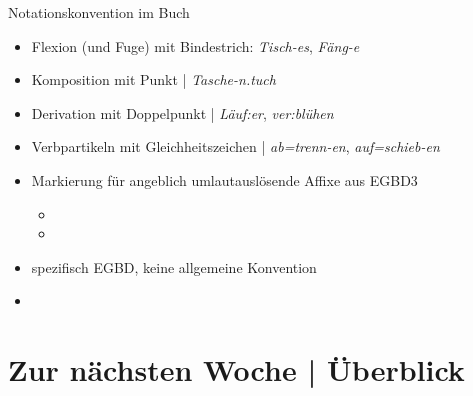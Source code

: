 \begin{frame}
  {Notationskonvention im Buch}
  \pause
  \begin{itemize}[<+->]
    \item \alert{Flexion (und Fuge)} mit Bindestrich: \textit{Tisch-es}, \textit{Fäng-e}
    \item \alert{Komposition} mit Punkt | \textit{Tasche-n.tuch}
    \item \alert{Derivation} mit Doppelpunkt | \textit{Läuf:er}, \textit{ver:blühen}
    \item \alert{Verbpartikeln} mit Gleichheitszeichen | \textit{ab=trenn-en}, \textit{auf=schieb-en}
    \Halbzeile
  \item Markierung für angeblich umlautauslösende Affixe aus EGBD3 
      \begin{itemize}[<+->]
        \item {}
        \item {}
      \end{itemize}
    \Halbzeile
  \item spezifisch EGBD, keine allgemeine Konvention
  \item {}
  \end{itemize}
\end{frame}


\ifdefined\TITLE
  \section{Zur nächsten Woche | Überblick}

